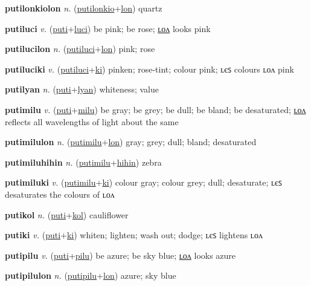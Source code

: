 \textbf{\hypertarget{putilonkiolon}{putilonkiolon}} \textit{n.} (\hyperlink{putilonkio}{putilonkio}+\allowbreak \hyperlink{lon}{lon})
quartz

\textbf{\hypertarget{putiluci}{putiluci}} \textit{v.} (\hyperlink{puti}{puti}+\allowbreak \hyperlink{luci}{luci})
be pink; be rose; \hyperlink{putilucilon}{ʟᴏᴧ} looks pink

\textbf{\hypertarget{putilucilon}{putilucilon}} \textit{n.} (\hyperlink{putiluci}{putiluci}+\allowbreak \hyperlink{lon}{lon})
pink; rose

\textbf{\hypertarget{putiluciki}{putiluciki}} \textit{v.} (\hyperlink{putiluci}{putiluci}+\allowbreak \hyperlink{ki}{ki})
pinken; rose-tint; colour pink; ʟєꜱ colours ʟᴏᴧ pink

\textbf{\hypertarget{putilyan}{putilyan}} \textit{n.} (\hyperlink{puti}{puti}+\allowbreak \hyperlink{lyan}{lyan})
whiteness; value

\textbf{\hypertarget{putimilu}{putimilu}} \textit{v.} (\hyperlink{puti}{puti}+\allowbreak \hyperlink{milu}{milu})
be gray; be grey; be dull; be bland; be desaturated; \hyperlink{putimilulon}{ʟᴏᴧ} reflects all wavelengths of light about the same

\textbf{\hypertarget{putimilulon}{putimilulon}} \textit{n.} (\hyperlink{putimilu}{putimilu}+\allowbreak \hyperlink{lon}{lon})
gray; grey; dull; bland; desaturated

\textbf{\hypertarget{putimiluhihin}{putimiluhihin}} \textit{n.} (\hyperlink{putimilu}{putimilu}+\allowbreak \hyperlink{hihin}{hihin})
zebra

\textbf{\hypertarget{putimiluki}{putimiluki}} \textit{v.} (\hyperlink{putimilu}{putimilu}+\allowbreak \hyperlink{ki}{ki})
colour gray; colour grey; dull; desaturate; ʟєꜱ desaturates the colours of ʟᴏᴧ

\textbf{\hypertarget{putikol}{putikol}} \textit{n.} (\hyperlink{puti}{puti}+\allowbreak \hyperlink{kol}{kol})
cauliflower

\textbf{\hypertarget{putiki}{putiki}} \textit{v.} (\hyperlink{puti}{puti}+\allowbreak \hyperlink{ki}{ki})
whiten; lighten; wash out; dodge; ʟєꜱ lightens ʟᴏᴧ

\textbf{\hypertarget{putipilu}{putipilu}} \textit{v.} (\hyperlink{puti}{puti}+\allowbreak \hyperlink{pilu}{pilu})
be azure; be sky blue; \hyperlink{putipilulon}{ʟᴏᴧ} looks azure

\textbf{\hypertarget{putipilulon}{putipilulon}} \textit{n.} (\hyperlink{putipilu}{putipilu}+\allowbreak \hyperlink{lon}{lon})
azure; sky blue


